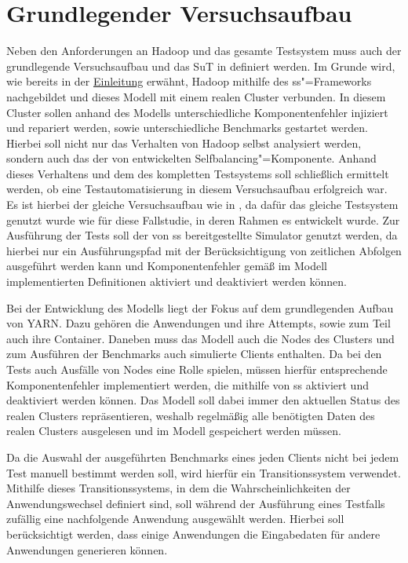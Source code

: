 \section{Grundlegender Versuchsaufbau}
\label{sec:clusterSetup}

Neben den Anforderungen an Hadoop und das gesamte Testsystem muss auch der grundlegende Versuchsaufbau und das \gls{SuT} in definiert werden.
Im Grunde wird, wie bereits in der \hyperref[ch:intro]{Einleitung} erwähnt, Hadoop mithilfe des \gls{ss}"=Frameworks nachgebildet und dieses Modell mit einem realen Cluster verbunden.
In diesem Cluster sollen anhand des Modells unterschiedliche Komponentenfehler injiziert und repariert werden, sowie unterschiedliche Benchmarks gestartet werden.
Hierbei soll nicht nur das Verhalten von Hadoop selbst analysiert werden, sondern auch das der von \citeauthor{Zhang2016} entwickelten Selfbalancing"=Komponente.
Anhand dieses Verhaltens und dem des kompletten Testsystems soll schließlich ermittelt werden, ob eine Testautomatisierung in diesem Versuchsaufbau erfolgreich war.
Es ist hierbei der gleiche Versuchsaufbau wie in \cite{Eberhardinger2018}, da dafür das gleiche Testsystem genutzt wurde wie für diese Fallstudie, in deren Rahmen es entwickelt wurde.
Zur Ausführung der Tests soll der von \gls{ss} bereitgestellte Simulator genutzt werden, da hierbei nur ein Ausführungspfad mit der Berücksichtigung von zeitlichen Abfolgen ausgeführt werden kann und Komponentenfehler gemäß im Modell implementierten Definitionen aktiviert und deaktiviert werden können.

Bei der Entwicklung des Modells liegt der Fokus auf dem grundlegenden Aufbau von YARN.
Dazu gehören die Anwendungen und ihre Attempts, sowie zum Teil auch ihre Container.
Daneben muss das Modell auch die Nodes des Clusters und zum Ausführen der Benchmarks auch simulierte Clients enthalten.
Da bei den Tests auch Ausfälle von Nodes eine Rolle spielen, müssen hierfür entsprechende Komponentenfehler implementiert werden, die mithilfe von \gls{ss} aktiviert und deaktiviert werden können.
Das Modell soll dabei immer den aktuellen Status des realen Clusters repräsentieren, weshalb regelmäßig alle benötigten Daten des realen Clusters ausgelesen und im Modell gespeichert werden müssen.

Da die Auswahl der ausgeführten Benchmarks eines jeden Clients nicht bei jedem Test manuell bestimmt werden soll, wird hierfür ein Transitionssystem verwendet.
Mithilfe dieses Transitionssystems, in dem die Wahrscheinlichkeiten der Anwendungswechsel definiert sind, soll während der Ausführung eines Testfalls zufällig eine nachfolgende Anwendung ausgewählt werden.
Hierbei soll berücksichtigt werden, dass einige Anwendungen die Eingabedaten für andere Anwendungen generieren können.

